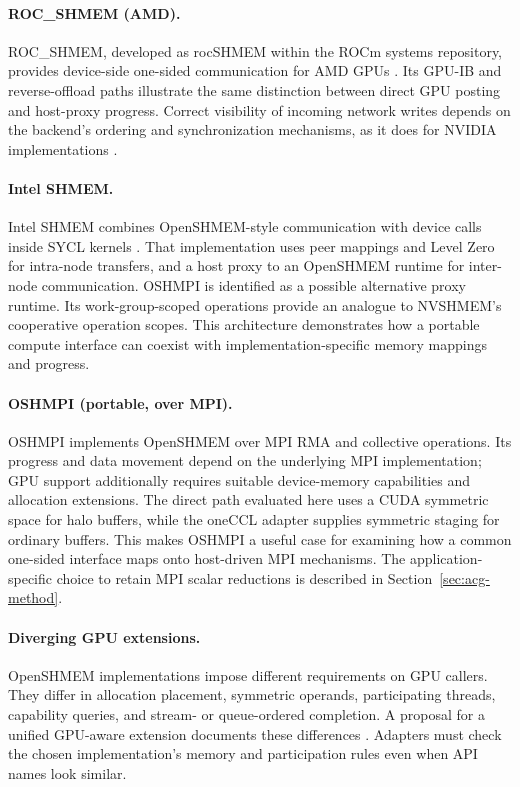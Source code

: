 \paragraph{ROC\_SHMEM (AMD).}
ROC\_SHMEM, developed as rocSHMEM within the ROCm systems repository, provides device-side one-sided communication for AMD GPUs \cite{amd_rocshmem_repo}. Its GPU-IB and reverse-offload paths illustrate the same distinction between direct GPU posting and host-proxy progress. Correct visibility of incoming network writes depends on the backend's ordering and synchronization mechanisms, as it does for NVIDIA implementations \cite{unat_landscape_2026}.

\paragraph{Intel SHMEM.}
Intel SHMEM combines OpenSHMEM-style communication with device calls inside SYCL kernels \cite{intel_ishmem_repo,brooks_intel_shmem_2024}. That implementation uses peer mappings and Level Zero for intra-node transfers, and a host proxy to an OpenSHMEM runtime for inter-node communication. OSHMPI is identified as a possible alternative proxy runtime. Its work-group-scoped operations provide an analogue to NVSHMEM's cooperative operation scopes. This architecture demonstrates how a portable compute interface can coexist with implementation-specific memory mappings and progress.

\paragraph{OSHMPI (portable, over MPI).}
OSHMPI implements OpenSHMEM over MPI RMA and collective operations. Its progress and data movement depend on the underlying MPI implementation; GPU support additionally requires suitable device-memory capabilities and allocation extensions. The direct path evaluated here uses a CUDA symmetric space for halo buffers, while the oneCCL adapter supplies symmetric staging for ordinary buffers. This makes OSHMPI a useful case for examining how a common one-sided interface maps onto host-driven MPI mechanisms. The application-specific choice to retain MPI scalar reductions is described in Section~\ref{sec:acg-method}.

\paragraph{Diverging GPU extensions.} OpenSHMEM implementations impose different requirements on GPU callers. They differ in allocation placement, symmetric operands, participating threads, capability queries, and stream- or queue-ordered completion. A proposal for a unified GPU-aware extension documents these differences \cite{ravi_unified_2026}. Adapters must check the chosen implementation's memory and participation rules even when API names look similar.

